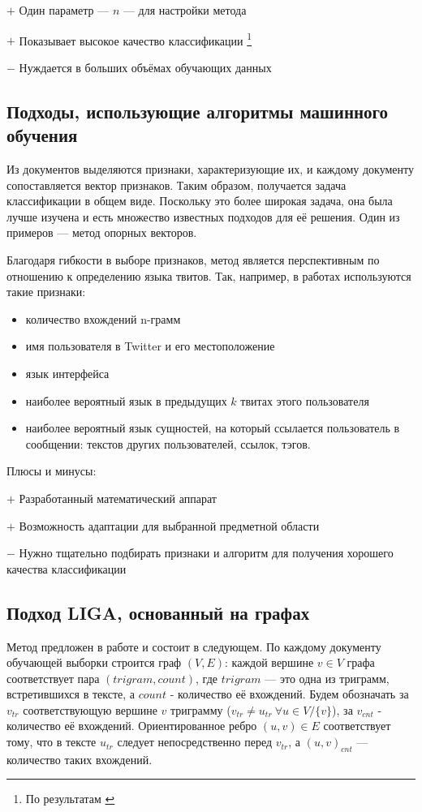 \documentclass[a4paper, 14pt]{article}
\begin{document}
		$+$ 	Один параметр --- $n$ --- для настройки метода
		
		$+$ Показывает высокое качество классификации \footnote{По результатам \cite{ppm}}
		
		$-$ Нуждается в больших объёмах обучающих данных
		
		\subsection{Подходы, использующие алгоритмы машинного обучения}
		Из документов выделяются признаки, характеризующие их, и каждому документу сопоставляется вектор признаков. 
		Таким образом, получается задача классификации в общем виде. Поскольку это более широкая задача, она была
		лучше изучена и есть множество известных подходов для её решения. Один из примеров --- 
		метод опорных векторов.
		 
		Благодаря гибкости в выборе признаков, метод является перспективным по отношению к определению языка твитов. Так, например, в работах \cite{ppm} \cite{lrev}
		используются такие признаки: 
		\begin{itemize}
			\item количество вхождений n-грамм
			\item имя пользователя в Twitter и его местоположение
			\item язык интерфейса
			\item наиболее вероятный язык в предыдущих $k$ твитах этого пользователя
			\item наиболее вероятный язык сущностей, на который ссылается пользователь в сообщении: текстов
		других пользователей, ссылок, тэгов.
		\end{itemize}		
		
		\noindent Плюсы и минусы:
		
		$+$ Разработанный математический аппарат
		
		$+$ Возможность адаптации для выбранной предметной области
		
		$-$ Нужно тщательно подбирать признаки и алгоритм для получения хорошего качества классификации
		
		\subsection{Подход LIGA, основанный на графах}
		Метод предложен в работе \cite{liga} и состоит в следующем.				
		По каждому документу обучающей выборки строится граф $(V, E)$:
		 каждой вершине $v \in V$ графа соответствует пара $(trigram, count)$, где $trigram$ --- это одна
		из триграмм, встретившихся в тексте, а $count$ - количество её вхождений. Будем обозначать за $v_{tr}$ соответствующую вершине $v$ триграмму
		($v_{tr} \neq u_{tr} \ \forall u \in V/ \{v\}$), за $v_{cnt}$ - количество её вхождений. 
		Ориентированное ребро $(u, v) \in E$ соответствует тому, что в тексте $u_{tr}$ следует непосредственно
		перед $v_{tr}$, а $(u, v)_{cnt}$ --- количество таких вхождений.
		
\end{document}
